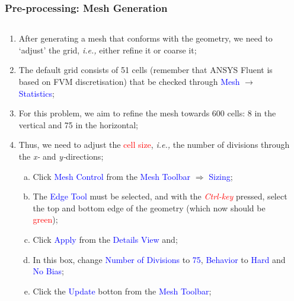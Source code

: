 \documentclass[10pt,compress, unknownkeysallowed]{beamer}
\newcommand{\red}{\textcolor{red}}
\newcommand{\blue}{\textcolor{blue}}
\newcommand{\ie}{{\it i.e., }}
\begin{document}
 
\begin{frame}
 \frametitle{Pre-processing: Mesh Generation} 
    \begin{columns}
       \begin{column}[l]{0.5\linewidth}
          \begin{enumerate}\scriptsize\setcounter{enumi}{6}
             \item<1-> After generating a mesh that conforms with the geometry, we need to `adjust' the grid, \ie either refine it or coarse it;
             \item<2-> The default grid consists of 51 cells (remember that ANSYS Fluent is based on FVM discretisation) that be checked through \blue{Mesh} $\rightarrow$ \blue{Statistics};
             \item<3-> For this problem, we aim to refine the mesh towards 600 cells: 8 in the vertical and 75 in the horizontal;
             \item<4-> Thus, we need to adjust the \red{cell size}, \ie the number of divisions through the {\it x-} and {\it y-}directions;
                \begin{enumerate}[a)]\scriptsize
                   \item<5-> Click \blue{Mesh Control} from the \blue{Mesh Toolbar} $\Rightarrow$ \blue{Sizing};
                   \item<5-> The \blue{Edge Tool} must be selected, and with the \red{\it Ctrl-key} pressed, select the top and bottom edge of the geometry (which now should be \red{green});
                   \item<5-> Click \blue{Apply} from the \blue{Details View} and;
                   \item<5-> In this box, change \blue{Number of Divisions} to \blue{75}, \blue{Behavior} to \blue{Hard} and \blue{No Bias};
                   \item<5-> Click the \blue{Update} botton from the \blue{Mesh Toolbar};
                \end{enumerate}
          \end{enumerate}
       \end{column}
       \begin{column}[l]{0.5\linewidth}
\end{column}
\end{columns}
\end{frame}
\end{document}
